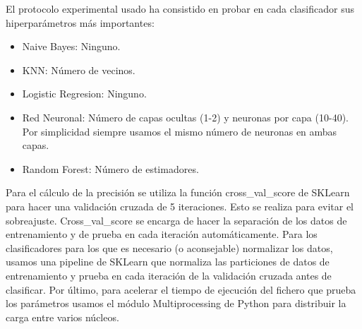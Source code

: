 \documentclass{esannV2}
\begin{document}
\clearpage
\noindent
El protocolo experimental usado ha consistido en probar en cada clasificador sus hiperparámetros más importantes:
\begin{itemize}[noitemsep]
\item Naive Bayes: Ninguno.
\item KNN: Número de vecinos.
\item Logistic Regresion: Ninguno.
\item Red Neuronal: Número de capas ocultas (1-2) y neuronas por capa (10-40). Por simplicidad siempre usamos el mismo número de neuronas en ambas capas.
\item Random Forest: Número de estimadores.
\end{itemize}
\noindent
Para el cálculo de la precisión se utiliza la función cross\_val\_score de SKLearn para hacer una validación cruzada de 5 iteraciones. Esto se realiza para evitar el sobreajuste. Cross\_val\_score se encarga de hacer la separación de los datos de entrenamiento y de prueba en cada iteración automáticamente. Para los clasificadores para los que es necesario (o aconsejable) normalizar los datos, usamos una pipeline de SKLearn que normaliza las particiones de datos de entrenamiento y prueba en cada iteración de la validación cruzada antes de clasificar.
\newline\newline
Por último, para acelerar el tiempo de ejecución del fichero que prueba los parámetros usamos el módulo Multiprocessing de Python  \cite{multiprocessing} para distribuir la carga entre varios núcleos.
\end{document}

